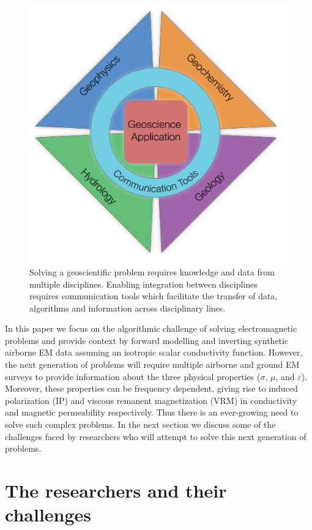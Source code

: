 \documentclass[paper]{geophysics}
\begin{document}
\begin{figure}
    \begin{center}
    \includegraphics[width=0.55\columnwidth]{figures/multidisciplinary.png}
    \end{center}
\caption{
    Solving a geoscientific problem requires knowledge and data from multiple disciplines. Enabling integration between disciplines requires communication tools which facilitate the transfer of data, algorithms and information across disciplinary lines.
}
\label{fig:multidisciplinary}
\end{figure}

In this paper we focus on the algorithmic challenge of solving electromagnetic problems and provide context by forward modelling and inverting synthetic airborne EM data assuming an isotropic scalar conductivity function. However, the next generation of problems will require multiple airborne and ground EM surveys to provide information about the three physical properties ($\sigma$, $\mu$, and $\varepsilon$). Moreover, these properties can be frequency dependent, giving rise to induced polarization (IP) and viscous remanent magnetization (VRM)  in conductivity and magnetic permeability respectively. Thus there is an ever-growing need to solve such complex problems. In the next section we discuss some of the challenges faced by  researchers who will attempt to solve this next generation of problems.



\section{The researchers and their challenges}
\end{document}
